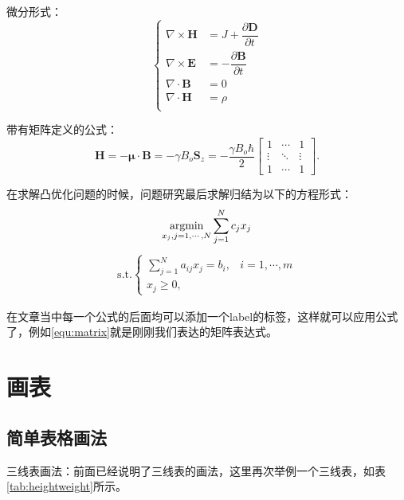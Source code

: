 微分形式：
\begin{equation}
    \begin{cases}
        \nabla\times\mathbf{H}&=J+\dfrac{\partial\mathbf{D}}{\partial{t}}\\
        \nabla\times\mathbf{E}&=-\dfrac{\partial\mathbf{B}}{\partial{t}}\\
        \nabla\cdot\mathbf{B}&=0\\
        \nabla\cdot\mathbf{H}&=\rho\\
    \end{cases}
    \label{equ:diff-function}
\end{equation}

带有矩阵定义的公式：
\begin{equation}
    \mathbf{H} = -\mathbf\mu \cdot \mathbf{B} = -\gamma B_o \mathbf{S}_z = -\frac{\gamma B_o\hbar}{2} 
        \begin{bmatrix}
            1& \cdots &1\\ 
            \vdots & \ddots & \vdots \\
            1 & \cdots & 1 
        \end{bmatrix}.
    \label{equ:matrix}
\end{equation}

在求解凸优化问题的时候，问题研究最后求解归结为以下的方程形式：
\begin{equation}
    \mathop{\mathrm{argmin}}\limits_{x_{j},j=1,\cdots,N}\sum\limits_{j=1}^{N}c_{j}x_{j}
\end{equation}
\begin{eqnarray}
    \text{s.t.}\begin{cases}
        \sum\limits_{j=1}^{N}a_{ij}x_{j}=b_{i},&i=1,\cdots,{m}\\
        x_{j}\geq{0},
    \end{cases}
\end{eqnarray}

在文章当中每一个公式的后面均可以添加一个label的标签，这样就可以应用公式了，例如\cref{equ:matrix}就是刚刚我们表达的矩阵表达式。

\section{画表}
\subsection{简单表格画法}
三线表画法：前面已经说明了三线表的画法，这里再次举例一个三线表，如表\ref{tab:heightweight}所示。


